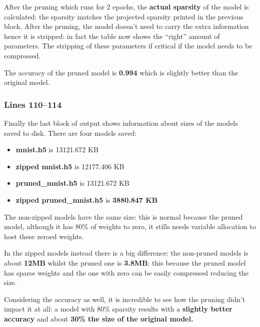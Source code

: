 After the pruning which runs for 2 epochs, the \textbf{actual sparsity} of the
model is calculated: the sparsity matches the projected sparsity printed in the
previous block. After the pruning, the model doesn't need to carry the extra
information hence it is stripped: in fact the table now shows the ``right''
amount of parameters. The stripping of these parameters if critical if the
model needs to be compressed.

The accuracy of the pruned model is \textbf{0.994} which is slightly better
than the original model.

\subsubsection{Lines 110--114}
Finally the last block of output shows information about sizes of the models
saved to disk. There are four models saved:
\begin{itemize}
    \item \textbf{mnist.h5} is 13121.672 KB
    \item \textbf{zipped mnist.h5} is 12177.406 KB
    \item \textbf{pruned\_mnist.h5} is 13121.672 KB
    \item \textbf{zipped pruned\_mnist.h5} is \textbf{3880.847 KB}
\end{itemize}
The non-zipped models have the same size: this is normal because the pruned
model, although it has 80\% of weights to zero, it stills needs variable
allocation to host these zeroed weights.

In the zipped models instead there is a big difference: the non-pruned models
is about \textbf{12MB} whilst the pruned one is \textbf{3.8MB}: this because
the pruned model has sparse weights and the one with zero can be easily
compressed reducing the size.

Considering the accuracy as well, it is incredible to see how the pruning
didn't impact it at all: a model with 80\% sparsity results with a
\textbf{slightly better accuracy} and about \textbf{30\% the size of the
original model.}
